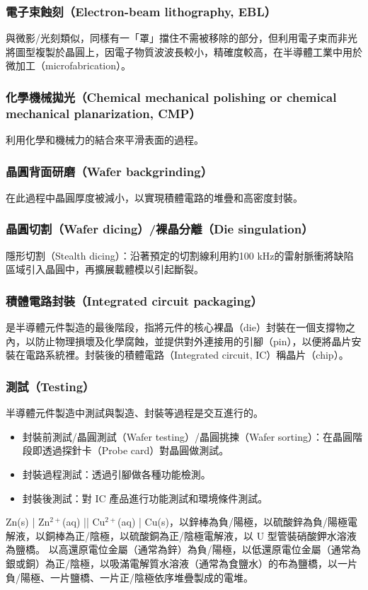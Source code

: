 \documentclass[a4paper,12pt]{report}
\begin{document}
\begin{itemize}
\begin{itemize}
\subsubsection{電子束蝕刻（Electron-beam lithography, EBL）}
與微影/光刻類似，同樣有一「罩」擋住不需被移除的部分，但利用電子束而非光將圖型複製於晶圓上，因電子物質波波長較小，精確度較高，在半導體工業中用於微加工（microfabrication）。
\subsubsection{化學機械拋光（Chemical mechanical polishing or chemical mechanical planarization, CMP）}
利用化學和機械力的結合來平滑表面的過程。
\subsubsection{晶圓背面研磨（Wafer backgrinding）}
在此過程中晶圓厚度被減小，以實現積體電路的堆疊和高密度封裝。
\subsubsection{晶圓切割（Wafer dicing）/裸晶分離（Die singulation）}
隱形切割（Stealth dicing）：沿著預定的切割線利用約100 kHz的雷射脈衝將缺陷區域引入晶圓中，再擴展載體模以引起斷裂。
\subsubsection{積體電路封裝（Integrated circuit packaging）}
是半導體元件製造的最後階段，指將元件的核心裸晶（die）封裝在一個支撐物之內，以防止物理損壞及化學腐蝕，並提供對外連接用的引腳（pin），以便將晶片安裝在電路系統裡。封裝後的積體電路（Integrated circuit, IC）稱晶片（chip）。
\subsubsection{測試（Testing）}
半導體元件製造中測試與製造、封裝等過程是交互進行的。
\begin{itemize}
\item 封裝前測試/晶圓測試（Wafer testing）/晶圓挑揀（Wafer sorting）：在晶圓階段即透過探針卡（Probe card）對晶圓做測試。
\item 封裝過程測試：透過引腳做各種功能檢測。
\item 封裝後測試：對 IC 產品進行功能測試和環境條件測試。
\end{itemize}
Zn(s) | Zn$^{2+}$(aq) || Cu$^{2+}$(aq) | Cu(s)，以鋅棒為負/陽極，以硫酸鋅為負/陽極電解液，以銅棒為正/陰極，以硫酸銅為正/陰極電解液，以 U 型管裝硝酸鉀水溶液為鹽橋。
以高還原電位金屬（通常為鋅）為負/陽極，以低還原電位金屬（通常為銀或銅）為正/陰極，以吸滿電解質水溶液（通常為食鹽水）的布為鹽橋，以一片負/陽極、一片鹽橋、一片正/陰極依序堆疊製成的電堆。

\end{itemize}
\end{itemize}
\end{document}
